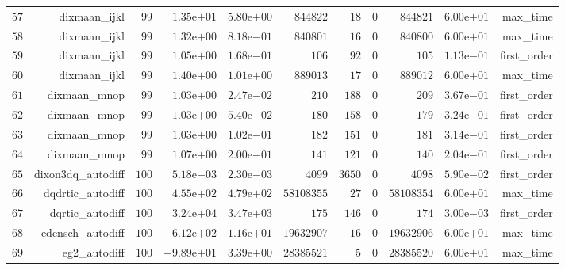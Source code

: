 \documentclass[varwidth=20cm,crop=true]{standalone}
\begin{document}
\begin{longtable}{rrrrrrrrrrr}
  \(    57\) & dixmaan\_ijkl & \(    99\) & \( 1.35\)e\(+01\) & \( 5.80\)e\(+00\) & \(844822\) & \(    18\) & \(     0\) & \(844821\) & \( 6.00\)e\(+01\) & max\_time \\
  \(    58\) & dixmaan\_ijkl & \(    99\) & \( 1.32\)e\(+00\) & \( 8.18\)e\(-01\) & \(840801\) & \(    16\) & \(     0\) & \(840800\) & \( 6.00\)e\(+01\) & max\_time \\
  \(    59\) & dixmaan\_ijkl & \(    99\) & \( 1.05\)e\(+00\) & \( 1.68\)e\(-01\) & \(   106\) & \(    92\) & \(     0\) & \(   105\) & \( 1.13\)e\(-01\) & first\_order \\
  \(    60\) & dixmaan\_ijkl & \(    99\) & \( 1.40\)e\(+00\) & \( 1.01\)e\(+00\) & \(889013\) & \(    17\) & \(     0\) & \(889012\) & \( 6.00\)e\(+01\) & max\_time \\
  \(    61\) & dixmaan\_mnop & \(    99\) & \( 1.03\)e\(+00\) & \( 2.47\)e\(-02\) & \(   210\) & \(   188\) & \(     0\) & \(   209\) & \( 3.67\)e\(-01\) & first\_order \\
  \(    62\) & dixmaan\_mnop & \(    99\) & \( 1.03\)e\(+00\) & \( 5.40\)e\(-02\) & \(   180\) & \(   158\) & \(     0\) & \(   179\) & \( 3.24\)e\(-01\) & first\_order \\
  \(    63\) & dixmaan\_mnop & \(    99\) & \( 1.03\)e\(+00\) & \( 1.02\)e\(-01\) & \(   182\) & \(   151\) & \(     0\) & \(   181\) & \( 3.14\)e\(-01\) & first\_order \\
  \(    64\) & dixmaan\_mnop & \(    99\) & \( 1.07\)e\(+00\) & \( 2.00\)e\(-01\) & \(   141\) & \(   121\) & \(     0\) & \(   140\) & \( 2.04\)e\(-01\) & first\_order \\
  \(    65\) & dixon3dq\_autodiff & \(   100\) & \( 5.18\)e\(-03\) & \( 2.30\)e\(-03\) & \(  4099\) & \(  3650\) & \(     0\) & \(  4098\) & \( 5.90\)e\(-02\) & first\_order \\
  \(    66\) & dqdrtic\_autodiff & \(   100\) & \( 4.55\)e\(+02\) & \( 4.79\)e\(+02\) & \(58108355\) & \(    27\) & \(     0\) & \(58108354\) & \( 6.00\)e\(+01\) & max\_time \\
  \(    67\) & dqrtic\_autodiff & \(   100\) & \( 3.24\)e\(+04\) & \( 3.47\)e\(+03\) & \(   175\) & \(   146\) & \(     0\) & \(   174\) & \( 3.00\)e\(-03\) & first\_order \\
  \(    68\) & edensch\_autodiff & \(   100\) & \( 6.12\)e\(+02\) & \( 1.16\)e\(+01\) & \(19632907\) & \(    16\) & \(     0\) & \(19632906\) & \( 6.00\)e\(+01\) & max\_time \\
  \(    69\) & eg2\_autodiff & \(   100\) & \(-9.89\)e\(+01\) & \( 3.39\)e\(+00\) & \(28385521\) & \(     5\) & \(     0\) & \(28385520\) & \( 6.00\)e\(+01\) & max\_time \\

\end{longtable}
\end{document}
